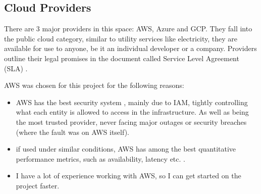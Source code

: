 \subsection{Cloud Providers}
There are 3 major providers in this space: AWS, Azure and GCP. They fall into the public cloud category, similar to utility services like electricity, they are available for use to anyone, be it an individual developer or a company. Providers outline their legal promises in the document called Service Level Agreement (SLA) \cite{cloudSLA}.

AWS was chosen for this project for the following reasons:
\begin{itemize}
    \item{AWS has the best security system \cite{Narula2015Cloud}, mainly due to IAM, tightly controlling what each entity is allowed to access in the infrastructure. As well as being the most trusted provider, never facing major outages or security breaches (where the fault was on AWS itself).}
    \item{if used under similar conditions, AWS has among the best quantitative performance metrics, such as availability, latency etc. \cite{CloudMetrics}.  }
    \item {I have a lot of experience working with AWS, so I can get started on the project faster.}
\end{itemize}
